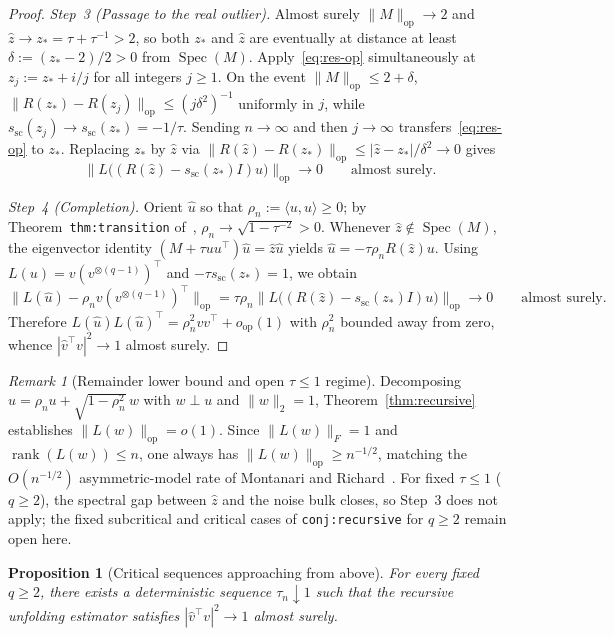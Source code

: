\documentclass[11pt]{article}
\theoremstyle{plain}
\newtheorem{proposition}[theorem]{Proposition}
\theoremstyle{definition}
\theoremstyle{remark}
\newtheorem{remark}{Remark}
\DeclareMathOperator{\rank}{rank}
\DeclareMathOperator{\Spec}{Spec}
\begin{document}
\begin{proof}
\emph{Step~3 (Passage to the real outlier).} Almost surely $\|M\|_{\mathrm{op}} \to 2$ and $\hat z \to z_* = \tau + \tau^{-1} > 2$, so both $z_*$ and $\hat z$ are eventually at distance at least $\delta := (z_* - 2)/2 > 0$ from $\Spec(M)$. Apply~\eqref{eq:res-op} simultaneously at $z_j := z_* + i/j$ for all integers $j \ge 1$. On the event $\|M\|_{\mathrm{op}} \le 2 + \delta$, $\|R(z_*) - R(z_j)\|_{\mathrm{op}} \le (j\delta^2)^{-1}$ uniformly in $j$, while $s_{\mathrm{sc}}(z_j) \to s_{\mathrm{sc}}(z_*) = -1/\tau$. Sending $n \to \infty$ and then $j \to \infty$ transfers~\eqref{eq:res-op} to $z_*$. Replacing $z_*$ by $\hat z$ via $\|R(\hat z) - R(z_*)\|_{\mathrm{op}} \le |\hat z - z_*|/\delta^2 \to 0$ gives
\[
\bigl\|L\bigl((R(\hat z) - s_{\mathrm{sc}}(z_*)I)u\bigr)\bigr\|_{\mathrm{op}} \longrightarrow 0
\qquad \text{almost surely.}
\]

\emph{Step~4 (Completion).} Orient $\hat u$ so that $\rho_n := \langle u, \hat u \rangle \ge 0$; by Theorem~\texttt{thm:transition} of~\cite{Szwagier2026}, $\rho_n \to \sqrt{1 - \tau^{-2}} > 0$. Whenever $\hat z \notin \Spec(M)$, the eigenvector identity $(M + \tau uu^\top)\hat u = \hat z \hat u$ yields $\hat u = -\tau \rho_n R(\hat z) u$. Using $L(u) = v(v^{\otimes(q-1)})^\top$ and $-\tau s_{\mathrm{sc}}(z_*) = 1$, we obtain
\[
\bigl\|L(\hat u) - \rho_n v(v^{\otimes(q-1)})^\top\bigr\|_{\mathrm{op}}
= \tau \rho_n \bigl\|L\bigl((R(\hat z) - s_{\mathrm{sc}}(z_*)I)u\bigr)\bigr\|_{\mathrm{op}} \longrightarrow 0
\qquad \text{almost surely.}
\]
Therefore $L(\hat u)L(\hat u)^\top = \rho_n^2 v v^\top + o_{\mathrm{op}}(1)$ with $\rho_n^2$ bounded away from zero, whence $|\hat v^\top v|^2 \to 1$ almost surely.
\end{proof}

\begin{remark}[Remainder lower bound and open $\tau \le 1$ regime]
Decomposing $\hat u = \rho_n u + \sqrt{1 - \rho_n^2}\, w$ with $w \perp u$ and $\|w\|_2 = 1$, Theorem~\ref{thm:recursive} establishes $\|L(w)\|_{\mathrm{op}} = o(1)$. Since $\|L(w)\|_F = 1$ and $\rank(L(w)) \le n$, one always has $\|L(w)\|_{\mathrm{op}} \ge n^{-1/2}$, matching the $O(n^{-1/2})$ asymmetric-model rate of Montanari and Richard~\cite[Theorem~5]{Montanari2014}.
For fixed $\tau \le 1$ ($q \ge 2$), the spectral gap between $\hat z$ and the noise bulk closes, so Step~3 does not apply; the fixed subcritical and critical cases of \texttt{conj:recursive} for $q \ge 2$ remain open here.
\end{remark}

\begin{proposition}[Critical sequences approaching from above]\label{prop:crit-seq}
For every fixed $q \ge 2$, there exists a deterministic sequence $\tau_n \downarrow 1$ such that the recursive unfolding estimator satisfies $|\hat v^\top v|^2 \to 1$ almost surely.
\end{proposition}
\end{document}
